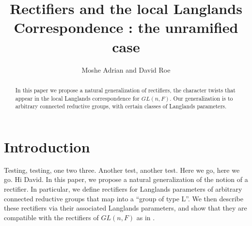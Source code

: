 \documentclass[11pt]{amsart}
\theoremstyle{plain}
\theoremstyle{definition}
\begin{document}
\title{Rectifiers and the local Langlands Correspondence : the unramified case}
\author{Moshe Adrian and David Roe}



\begin{abstract}

\maketitle

In this paper we propose a natural generalization of rectifiers, the
character twists that appear in the local Langlands correspondence for
$GL(n,F)$.  Our generalization is to arbitrary connected reductive
groups, with certain classes of Langlands parameters.

\end{abstract}

\section{Introduction}
Testing, testing, one two three.  Another test, another test.  Here we go, here we go.  Hi David.  In this paper, we propose a natural generalization of the notion of a
rectifier.  In particular, we define rectifiers for Langlands
parameters of arbitrary connected reductive groups that map into a
``group of type L''.  We then describe these rectifiers via their
associated Langlands parameters, and show that they are compatible
with the rectifiers of $GL(n,F)$ as in \cite{bushnellhenniart}.
\end{document}
